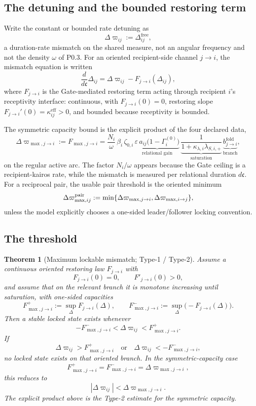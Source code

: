 \documentclass[11pt,a4paper]{article}
\theoremstyle{definition}
\theoremstyle{plain}
\newtheorem{theorem}[definition]{Theorem}
\theoremstyle{remark}
\begin{document}
\subsection{The detuning and the bounded restoring term}

Write the constant or bounded rate detuning as
\[
\Delta\varpi_{ij}:=\Delta^{\mathrm{free}}_{ij},
\]
a duration-rate mismatch on the shared measure, not an angular frequency and not
the density \(\omega\) of P0.3. For an oriented recipient-side channel
\(j\to i\), the mismatch equation is written
\[
\frac{d}{d\mathfrak c}\Delta_{ij}
=
\Delta\varpi_{ij}-F_{j\to i}(\Delta_{ij}),
\]
where \(F_{j\to i}\) is the Gate-mediated restoring term acting through recipient
\(i\)'s receptivity interface: continuous, with \(F_{j\to i}(0)=0\), restoring slope
\(F_{j\to i}'(0)=\kappa^{\mathrm{eff}}_{ij}>0\), and bounded because receptivity is
bounded.

The symmetric capacity bound is the explicit product of the four declared data,
\[
\boxed{\;
\Delta\varpi_{\max,j\to i}
:=
F_{\max,j\to i}
=
\frac{N_i}{\omega}\,
\beta_i\,\zeta_{0,i}\,
\underbrace{\varepsilon\,a_{ij}\bigl(1-\Gamma_i^{(0)}\bigr)}_{\text{relational gain}}\,
\underbrace{\frac{1}{1+\kappa_{\lambda,i}\lambda_{S,i,+}}}_{\text{saturation}}\,
\underbrace{b^{\mathrm{fold}}_{j\to i}}_{\text{branch}},
\;}
\]
on the regular active arc. The factor \(N_i/\omega\) appears because the Gate
ceiling is a recipient-kairos rate, while the mismatch is measured per relational
duration \(d\mathfrak c\). For a reciprocal pair, the usable pair threshold is the
oriented minimum
\[
\Delta\varpi_{\max,ij}^{\rm pair}
:=
\min\{\Delta\varpi_{\max,j\to i},\Delta\varpi_{\max,i\to j}\},
\]
unless the model explicitly chooses a one-sided leader/follower locking
convention.

\subsection{The threshold}

\begin{theorem}[Maximum lockable mismatch; Type-1 / Type-2]\label{thm:maxlock}
Assume a continuous oriented restoring law \(F_{j\to i}\) with
\[
F_{j\to i}(0)=0,
\qquad
F'_{j\to i}(0)>0,
\]
and assume that on the relevant branch it is monotone increasing until saturation,
with one-sided capacities
\[
F^+_{\max,j\to i}:=\sup_{\Delta}F_{j\to i}(\Delta),
\qquad
F^-_{\max,j\to i}:=\sup_{\Delta}\bigl(-F_{j\to i}(\Delta)\bigr).
\]
Then a stable locked state exists whenever
\[
-F^-_{\max,j\to i}
<
\Delta\varpi_{ij}
<
F^+_{\max,j\to i}.
\]
If
\[
\Delta\varpi_{ij}>F^+_{\max,j\to i}
\quad\text{or}\quad
\Delta\varpi_{ij}< -F^-_{\max,j\to i},
\]
no locked state exists on that oriented branch. In the symmetric-capacity case
\[
F^+_{\max,j\to i}=F^-_{\max,j\to i}
=\Delta\varpi_{\max,j\to i},
\]
this reduces to
\[
|\Delta\varpi_{ij}|<\Delta\varpi_{\max,j\to i}.
\]
The explicit product above is the Type-2 estimate for the symmetric capacity.
\end{theorem}
\end{document}
